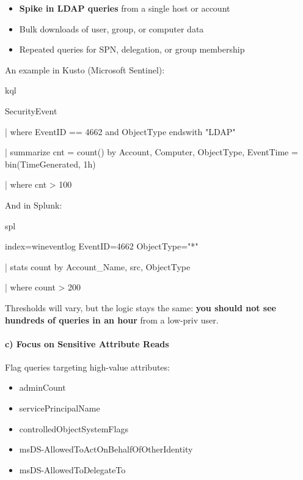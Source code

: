 {{\begin{itemize}
    \item \textbf{Spike in LDAP queries} from a single host or account

    \item Bulk downloads of user, group, or computer data

    \item Repeated queries for SPN, delegation, or group membership

\end{itemize}
An example in Kusto (Microsoft Sentinel):

kql

 

SecurityEvent

| where EventID == 4662 and ObjectType endswith "LDAP"

| summarize cnt = count() by Account, Computer, ObjectType, EventTime = bin(TimeGenerated, 1h)

| where cnt > 100

And in Splunk:

spl

 

index=wineventlog EventID=4662 ObjectType="*" 

| stats count by Account\_Name, src, ObjectType 

| where count > 200

Thresholds will vary, but the logic stays the same: \textbf{you should not see hundreds of queries in an hour} from a low-priv user.

\paragraph{\textbf{   c) Focus on Sensitive Attribute Reads}}

Flag queries targeting high-value attributes:

\begin{itemize}
    \item adminCount

    \item servicePrincipalName

    \item controlledObjectSystemFlags

    \item msDS-AllowedToActOnBehalfOfOtherIdentity

    \item msDS-AllowedToDelegateTo


\end{itemize}}}
